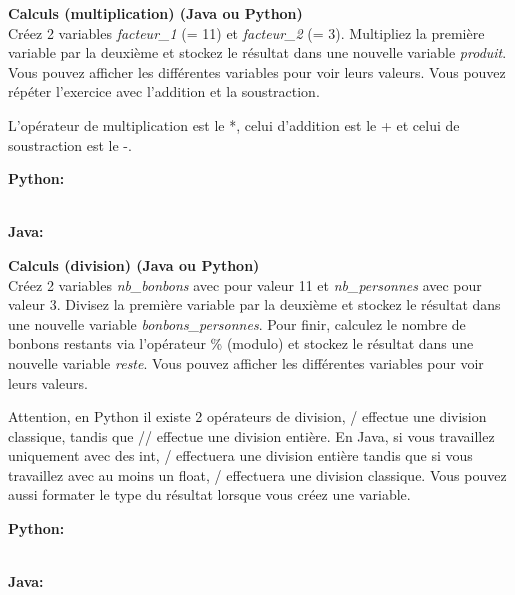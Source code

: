 \begin{Exercice}[3 minutes] \textbf{Calculs (multiplication) (Java ou Python)}\\

   Créez 2 variables \textit{facteur\_1} (= 11) et \textit{facteur\_2} (= 3). Multipliez la première variable par la deuxième et stockez le résultat dans une nouvelle variable \textit{produit}. Vous pouvez afficher les différentes variables pour voir leurs valeurs. Vous pouvez répéter l'exercice avec l'addition et la soustraction. \\
   
    \begin{conseil}
      	L'opérateur de multiplication est le *, celui d'addition est le + et celui de soustraction est le -.
        
    \end{conseil}
    \begin{solution}
    
    \textbf{Python:}
    
    
    \textbf{\\Java:}
    
           
    \end{solution}   
\end{Exercice}

\begin{Exercice}[10 minutes] \textbf{Calculs (division) (Java ou Python)}\\
    Créez 2 variables \textit{nb\_bonbons} avec pour valeur 11 et \textit{nb\_personnes} avec pour valeur 3. Divisez la première variable par la deuxième et stockez le résultat dans une nouvelle variable \textit{bonbons\_personnes}. Pour finir, calculez le nombre de bonbons restants via l'opérateur \% (modulo) et stockez le résultat dans une nouvelle variable \textit{reste}. Vous pouvez afficher les différentes variables pour voir leurs valeurs. \\
    
     \begin{conseil}
           Attention, en Python il existe 2 opérateurs de division, / effectue une division classique, tandis que // effectue une division entière. En Java, si vous travaillez uniquement avec des int, / effectuera une division entière tandis que si vous travaillez avec au moins un float, / effectuera une division classique. Vous pouvez aussi formater le type du résultat lorsque vous créez une variable.
         
     \end{conseil}
     \begin{solution}
     
     \textbf{Python:}
     
     
     
     \textbf{\\Java:}
     
            
     \end{solution}   
 \end{Exercice}
 

